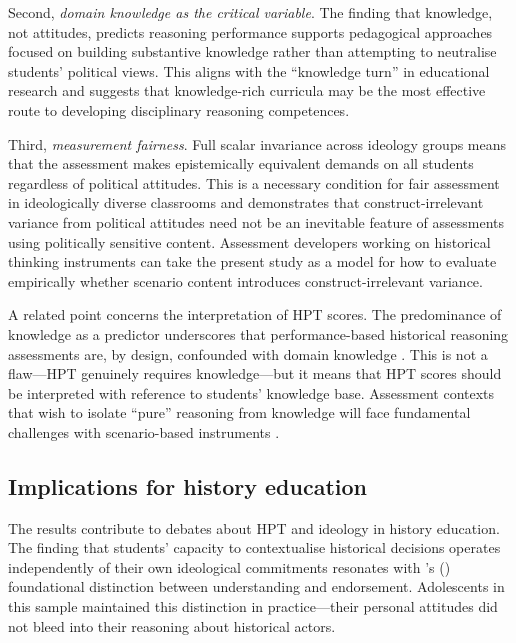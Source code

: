 \documentclass[pdflatex,sn-apa]{sn-jnl}%
\begin{document}
Second, \emph{domain knowledge as the critical variable}. The finding that knowledge, not attitudes, predicts reasoning performance supports pedagogical approaches focused on building substantive knowledge rather than attempting to neutralise students' political views. This aligns with the ``knowledge turn'' in educational research \citep{Chapman2021} and suggests that knowledge-rich curricula may be the most effective route to developing disciplinary reasoning competences.

Third, \emph{measurement fairness}. Full scalar invariance across ideology groups means that the assessment makes epistemically equivalent demands on all students regardless of political attitudes. This is a necessary condition for fair assessment in ideologically diverse classrooms and demonstrates that construct-irrelevant variance from political attitudes need not be an inevitable feature of assessments using politically sensitive content. Assessment developers working on historical thinking instruments can take the present study as a model for how to evaluate empirically whether scenario content introduces construct-irrelevant variance.

A related point concerns the interpretation of HPT scores. The predominance of knowledge as a predictor underscores that performance-based historical reasoning assessments are, by design, confounded with domain knowledge \citep{Seixas2015a}. This is not a flaw---HPT genuinely requires knowledge---but it means that HPT scores should be interpreted with reference to students' knowledge base. Assessment contexts that wish to isolate ``pure'' reasoning from knowledge will face fundamental challenges with scenario-based instruments \citep{Smith2017}.

\subsection{Implications for history education}\label{subsec:implications_history}

The results contribute to debates about HPT and ideology in history education. The finding that students' capacity to contextualise historical decisions operates independently of their own ideological commitments resonates with \citeauthor{Lee2001}'s (\citeyear{Lee2001}) foundational distinction between understanding and endorsement. Adolescents in this sample maintained this distinction in practice---their personal attitudes did not bleed into their reasoning about historical actors.
\end{document}
